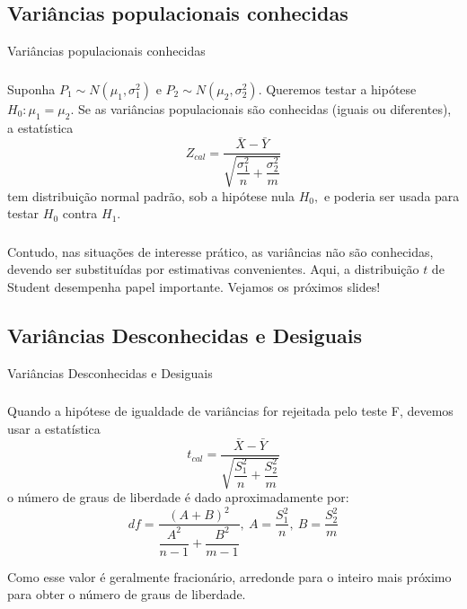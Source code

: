 \documentclass[14pt,aspectratio=1610]{beamer}
\newcommand{\Ho}{\ensuremath{H_{0}}}
\newcommand{\Hi}{\ensuremath{H_{1}}}
\begin{document}
\subsection{Variâncias populacionais conhecidas}
\begin{frame}{Variâncias populacionais conhecidas}
\frametitle{}
\begin{block}{}
\justifying
Suponha $P_{1}\sim N(\mu_{1},\sigma_{1}^{2})$ e $P_{2}\sim N(\mu_{2},\sigma_{2}^{2}).$ Queremos testar a hipótese $H_{0}:\mu_{1}=\mu_{2}.$ Se as variâncias populacionais são conhecidas (iguais ou diferentes), a estatística $$Z_{cal}=\dfrac{\bar{X}-\bar{Y}}{\sqrt{\dfrac{\sigma_{1}^{2}}{n}+\dfrac{\sigma_{2}^{2}}{m}}}$$ tem distribuição normal padrão, sob a hipótese nula $H_{0},$ e poderia ser usada para testar $\Ho$ contra $\Hi$.
\end{block}
\end{frame}

\begin{frame}{}
\frametitle{}
\begin{block}{}
\justifying
Contudo, nas situações de interesse prático, as variâncias não são conhecidas, devendo ser substituídas por estimativas convenientes. Aqui, a distribuição $t$ de Student desempenha papel importante. Vejamos os próximos slides!
\end{block}
\end{frame}

\subsection{Variâncias Desconhecidas e Desiguais}
\begin{frame}{Variâncias Desconhecidas e Desiguais}
\frametitle{}
\begin{block}{}
\justifying
Quando a hipótese de igualdade de variâncias for rejeitada pelo teste F, devemos usar a estatística $$t_{cal}=\dfrac{\bar{X}-\bar{Y}}{\sqrt{\dfrac{S_{1}^{2}}{n}+\dfrac{S_{2}^{2}}{m}}}$$ o número de graus de liberdade é dado aproximadamente por:
\vspace{-0.2cm}
$$df=\dfrac{(A+B)^{2}}{\dfrac{A^{2}}{n-1}+\dfrac{B^{2}}{m-1}},\ 
A=\dfrac{S_{1}^{2}}{n},\ B=\dfrac{S_{2}^{2}}{m}$$
\end{block}\pause
\vspace{-0.5cm}
\begin{block}{}
Como esse valor é geralmente fracionário, arredonde para o inteiro mais próximo
para obter o número de graus de liberdade.
\end{block}
\end{frame}
\end{document}
